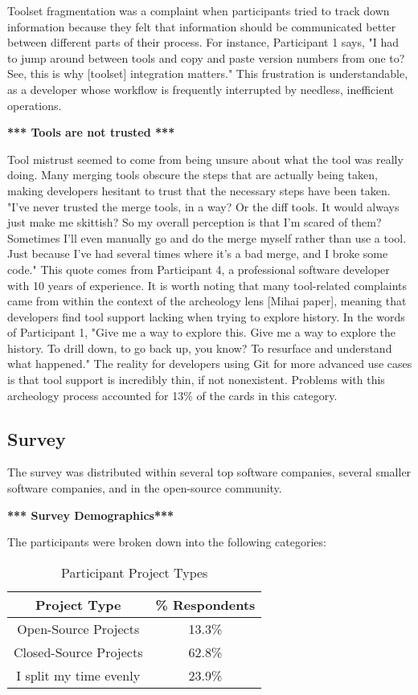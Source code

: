 Toolset fragmentation was a complaint when participants tried to track down information because they felt that information should be communicated better between different parts of their process. For instance, Participant 1 says, "I had to jump around between tools and copy and paste version numbers from one to? See, this is why [toolset] integration matters." This frustration is understandable, as a developer whose workflow is frequently interrupted by needless, inefficient operations.

\textbf{*** Tools are not trusted ***}

Tool mistrust seemed to come from being unsure about what the tool was really doing. Many merging tools obscure the steps that are actually being taken, making developers hesitant to trust that the necessary steps have been taken. "I've never trusted the merge tools, in a way? Or the diff tools. It would always just make me skittish? So my overall perception is that I'm scared of them? Sometimes I'll even manually go and do the merge myself rather than use a tool. Just because I've had several times where it's a bad merge, and I broke some code." This quote comes from Participant 4, a professional software developer with 10 years of experience. 
It is worth noting that many tool-related complaints came from within the context of the archeology lens [Mihai paper], meaning that developers find tool support lacking when trying to explore history. In the words of Participant 1, "Give me a way to explore this. Give me a way to explore the history. To drill down, to go back up, you know? To resurface and understand what happened." The reality for developers using Git for more advanced use cases is that tool support is incredibly thin, if not nonexistent. Problems with this archeology process accounted for 13\% of the cards in this category.

\subsection{Survey}

The survey was distributed within several top software companies, several smaller software companies, and in the open-source community.

\textbf{*** Survey Demographics***}

The participants were broken down into the following categories:

\begin{table}[!t]
\renewcommand{\arraystretch}{1.3}
\caption{Participant Project Types}
\label{project_type}
\centering
\begin{tabular}{|c||c|}
\hline
Project Type & \% Respondents\\
\hline
Open-Source Projects & 13.3\%\\
Closed-Source Projects & 62.8\%\\
I split my time evenly & 23.9\%\\
\hline
\end{tabular}
\end{table}

